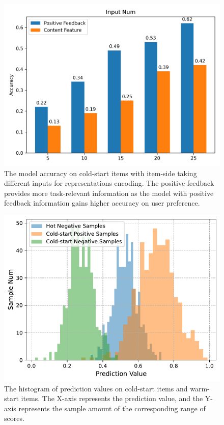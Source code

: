 \documentclass[sigconf]{acmart}
\begin{document}
\begin{figure}
	\centering
	\includegraphics[width=0.8\columnwidth]{figure/performance_compare.pdf}
	\caption{The model accuracy on cold-start items with item-side taking different inputs for representations encoding. The positive feedback provides more task-relevant information as the model with positive feedback information gains higher accuracy on user preference.}
	\label{case1}

\end{figure}
\begin{figure}
	\centering
	\includegraphics[width=0.8\columnwidth]{figure/observation_hist.pdf}
	\caption{The histogram of prediction values on cold-start items and warm-start items. The X-axis represents the prediction value, and the Y-axis represents the sample amount of the corresponding range of scores.}
	\label{case2}

\end{figure}
\end{document}
